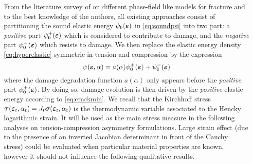 From the literature survey of \cite{AmbatiGerasimovLorenzis:2015} on different phase-field like models for fracture and to the best knowledge of the authors, all existing approaches consist of partitioning the sound elastic energy $\psi_0(\eps)$ in \eqref{eq:soundpsi} into two part: a \emph{positive} part $\psi_0^+(\eps)$ which is considered to contribute to damage, and the \emph{negative} part $\psi_0^-(\eps)$ which resists to damage. We then replace the elastic energy density \eqref{eq:hyperelastic} symmetric in tension and compression by the expression
\begin{equation} \label{eq:elasticTC}
\psi(\eps,\alpha)=a(\alpha)\psi_0^+(\eps)+\psi_0^-(\eps)
\end{equation}
where the damage degradation function $a(\alpha)$ only appears before the \emph{positive} part $\psi_0^+(\eps)$. By doing so, damage evolution is then driven by the \emph{positive} elastic energy according to \eqref{eq:crackmin}. We recall that the Kirchhoff stress $\vtau(\eps_t,\alpha_t)=J_t\sig(\eps_t,\alpha_t)$ is the thermodynamic variable associated to the Hencky logarithmic strain. It will be used as the main stress measure in the following analyses on tension-compression asymmetry formulations. Large strain effect (due to the presence of an inverted Jacobian determinant in front of the Cauchy stress) could be evaluated when particular material properties are known, however it should not influence the following qualitative results.

